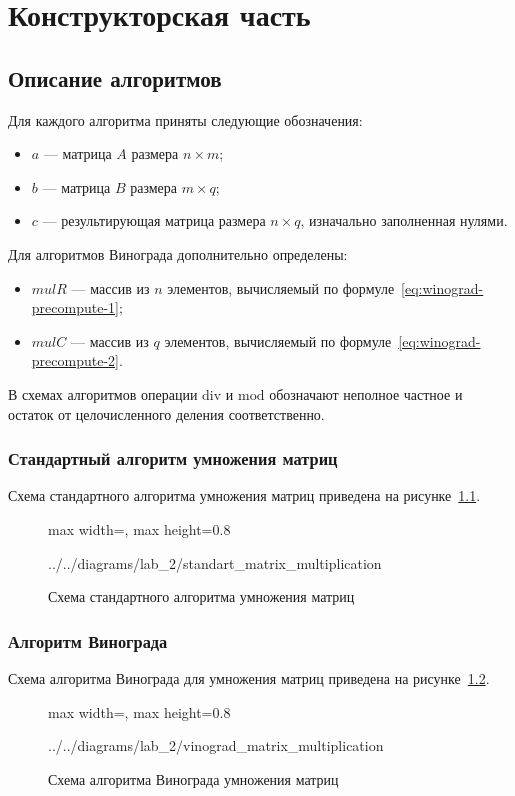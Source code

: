 \documentclass{bmstu}
\begin{document}
\chapter{Конструкторская часть}

\section{Описание алгоритмов}
Для каждого алгоритма приняты следующие обозначения:
\begin{itemize}
	\item $a$ — матрица $A$ размера $n \times  m$;
	\item $b$ — матрица $B$ размера $m \times  q$;
	\item $c$ — результирующая матрица размера $n \times  q$, изначально
	      заполненная нулями.
\end{itemize}

Для алгоритмов Винограда дополнительно определены:
\begin{itemize}
	\item $\mathit{mulR}$ — массив из $n$ элементов, вычисляемый по формуле~\ref{eq:winograd-precompute-1};
	\item $\mathit{mulC}$ — массив из $q$ элементов, вычисляемый по формуле~\ref{eq:winograd-precompute-2}.
\end{itemize}

В схемах алгоритмов операции $\mathrm{div}$ и $\mathrm{mod}$ обозначают неполное частное и
остаток от целочисленного деления соответственно.

\subsection{Стандартный алгоритм умножения матриц}
Схема стандартного алгоритма умножения матриц приведена на рисунке~\ref{fig:standart_matrix_multiplication}.
\begin{figure}[H]
	\centering
	\begin{adjustbox}{max width=\textwidth, max height=0.8\textheight}
		
		{../../diagrams/lab_2/standart_matrix_multiplication}
	\end{adjustbox}
	\caption{Схема стандартного алгоритма умножения матриц}
	\label{fig:standart_matrix_multiplication}
\end{figure}

\subsection{Алгоритм Винограда}
Схема алгоритма Винограда для умножения матриц приведена на рисунке~\ref{fig:vinograd_matrix_multiplication}.
\begin{figure}[H]
	\centering
	\begin{adjustbox}{max width=\textwidth, max height=0.8\textheight}
		
		{../../diagrams/lab_2/vinograd_matrix_multiplication}
	\end{adjustbox}
	\caption{Схема алгоритма Винограда умножения матриц}
	\label{fig:vinograd_matrix_multiplication}
\end{figure}
\end{document}
